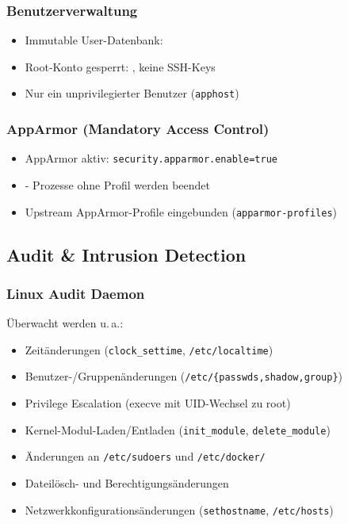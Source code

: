 \subsubsection*{Benutzerverwaltung}
\begin{itemize}
  \item Immutable User-Datenbank: \texttt{}
  \item Root-Konto gesperrt: \texttt{}, keine \acs{SSH}-Keys
  \item Nur ein unprivilegierter Benutzer (\texttt{apphost})
\end{itemize}

\subsubsection*{AppArmor (Mandatory Access Control)}
\begin{itemize}
  \item AppArmor aktiv: \texttt{security.apparmor.enable=true}
  \item \texttt{} - Prozesse ohne Profil werden beendet
  \item Upstream AppArmor-Profile eingebunden (\texttt{apparmor-profiles})
\end{itemize}


\subsection{Audit \& Intrusion Detection}
\subsubsection*{Linux Audit Daemon}
Überwacht werden u.\,a.:
\begin{itemize}
  \item Zeitänderungen (\texttt{clock\_settime}, \texttt{/etc/localtime})
  \item Benutzer-/Gruppenänderungen (\texttt{/etc/\{passwds,shadow,group\}})
  \item Privilege Escalation (execve mit UID-Wechsel zu root)
  \item Kernel-Modul-Laden/Entladen (\texttt{init\_module}, \texttt{delete\_module})
  \item Änderungen an \texttt{/etc/sudoers} und \texttt{/etc/docker/}
  \item Dateilösch- und Berechtigungsänderungen
  \item Netzwerkkonfigurationsänderungen (\texttt{sethostname}, \texttt{/etc/hosts})
\end{itemize}

